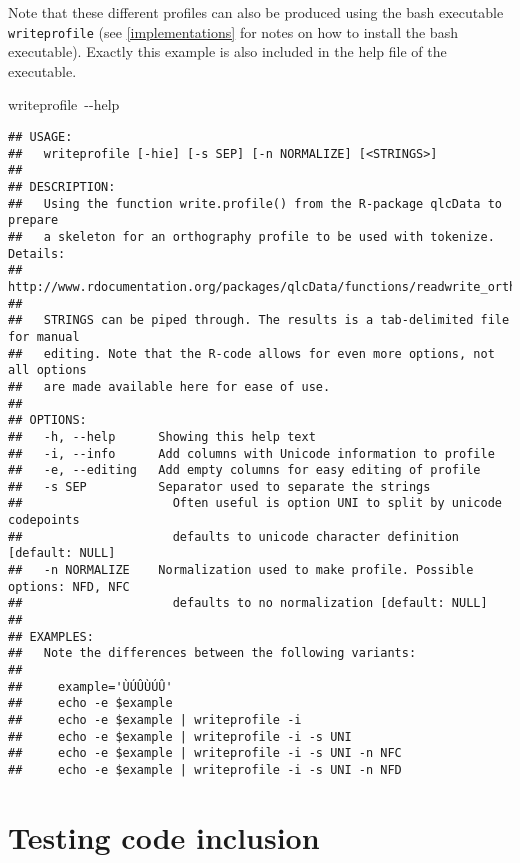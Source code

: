 \documentclass[output=inprep,
		biblatex
		]{LSP/langsci}\usepackage[]{graphicx}\usepackage[]{color}
\makeatletter
\newcommand{\hlopt}[1]{\textcolor[rgb]{0,0,0}{#1}}%
\newcommand{\hlstd}[1]{\textcolor[rgb]{0.345,0.345,0.345}{#1}}%
\newcommand{\hlkwb}[1]{\textcolor[rgb]{0.69,0.353,0.396}{#1}}%
\newenvironment{kframe}{%
 \def\at@end@of@kframe{}%
 \ifinner\ifhmode%
  \def\at@end@of@kframe{\end{minipage}}%
  \begin{minipage}{\columnwidth}%
 \fi\fi%
 \def\FrameCommand##1{\hskip\@totalleftmargin \hskip-\fboxsep
 \colorbox{shadecolor}{##1}\hskip-\fboxsep
     \hskip-\linewidth \hskip-\@totalleftmargin \hskip\columnwidth}%
 \MakeFramed {\advance\hsize-\width
   \@totalleftmargin\z@ \linewidth\hsize
   \@setminipage}}%
 {\par\unskip\endMakeFramed%
 \at@end@of@kframe}
\newenvironment{knitrout}{}{} %
\makeatother
\begin{document}
\noindent Note that these different profiles can also be produced using the bash 
executable \texttt{writeprofile} (see \ref{implementations} for notes on how to 
install the bash executable). Exactly this example is also included in the help 
file of the executable.

\begin{knitrout}\tiny
{}\color{fgcolor}\begin{kframe}
\noindent
\ttfamily
\hlstd{writeprofile\ }\hlopt{{-}{-}}\hlstd{}\hlkwb{help}\hlstd{}\hspace*{\fill}
\mbox{}
\normalfont

\begin{verbatim}
## USAGE: 
##   writeprofile [-hie] [-s SEP] [-n NORMALIZE] [<STRINGS>]
## 
## DESCRIPTION:
##   Using the function write.profile() from the R-package qlcData to prepare 
##   a skeleton for an orthography profile to be used with tokenize. Details:
##   http://www.rdocumentation.org/packages/qlcData/functions/readwrite_orthography
## 
##   STRINGS can be piped through. The results is a tab-delimited file for manual
##   editing. Note that the R-code allows for even more options, not all options 
##   are made available here for ease of use.
## 
## OPTIONS:
##   -h, --help      Showing this help text
##   -i, --info      Add columns with Unicode information to profile
##   -e, --editing   Add empty columns for easy editing of profile
##   -s SEP          Separator used to separate the strings
##                     Often useful is option UNI to split by unicode codepoints
##                     defaults to unicode character definition [default: NULL]
##   -n NORMALIZE    Normalization used to make profile. Possible options: NFD, NFC
##                     defaults to no normalization [default: NULL]
##                     
## EXAMPLES:
##   Note the differences between the following variants:
## 
##     example='ÙÚÛÙÚÛ'
##     echo -e $example
##     echo -e $example | writeprofile -i
##     echo -e $example | writeprofile -i -s UNI
##     echo -e $example | writeprofile -i -s UNI -n NFC
##     echo -e $example | writeprofile -i -s UNI -n NFD
\end{verbatim}
\end{kframe}
\end{knitrout}




\chapter{Testing code inclusion}
\end{document}
